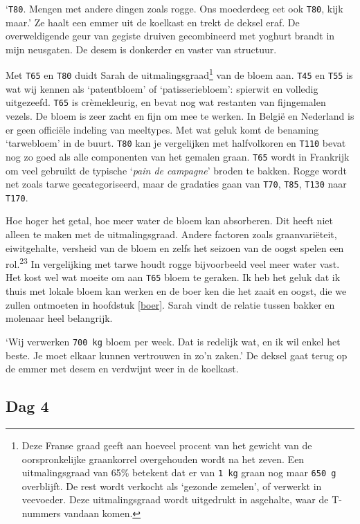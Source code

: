 \documentclass[
  11pt,
  dutch,
]{memoir}
\begin{document}
`\texttt{T80}. Mengen met andere dingen zoals rogge. Ons moederdeeg eet
ook \texttt{T80}, kijk maar.' Ze haalt een emmer uit de koelkast en
trekt de deksel eraf. De overweldigende geur van gegiste druiven
gecombineerd met yoghurt brandt in mijn neusgaten. De desem is donkerder
en vaster van structuur.

Met \texttt{T65} en \texttt{T80} duidt Sarah de
uitmalingsgraad\footnote{Deze Franse graad geeft aan hoeveel procent van
  het gewicht van de oorspronkelijke graankorrel overgehouden wordt na
  het zeven. Een uitmalingsgraad van 65\% betekent dat er van
  \texttt{1\ kg} graan nog maar \texttt{650\ g} overblijft. De rest
  wordt verkocht als `gezonde zemelen', of verwerkt in veevoeder. Deze
  uitmalingsgraad wordt uitgedrukt in asgehalte, waar de T-nummers
  vandaan komen.} van de bloem aan. \texttt{T45} en \texttt{T55} is wat
wij kennen als `patentbloem' of `patisseriebloem': spierwit en volledig
uitgezeefd. \texttt{T65} is crèmekleurig, en bevat nog wat restanten van
fijngemalen vezels. De bloem is zeer zacht en fijn om mee te werken. In
België en Nederland is er geen officiële indeling van meeltypes. Met wat
geluk komt de benaming `tarwebloem' in de buurt. \texttt{T80} kan je
vergelijken met halfvolkoren en \texttt{T110} bevat nog zo goed als alle
componenten van het gemalen graan. \texttt{T65} wordt in Frankrijk om
veel gebruikt de typische `\emph{pain de campagne}' broden te bakken.
Rogge wordt net zoals tarwe gecategoriseerd, maar de gradaties gaan van
\texttt{T70}, \texttt{T85}, \texttt{T130} naar \texttt{T170}.

Hoe hoger het getal, hoe meer water de bloem kan absorberen. Dit heeft
niet alleen te maken met de uitmalingsgraad. Andere factoren zoals
graanvariëteit, eiwitgehalte, versheid van de bloem en zelfs het seizoen
van de oogst spelen een rol.\textsuperscript{23} In vergelijking met
tarwe houdt rogge bijvoorbeeld veel meer water vast. Het kost wel wat
moeite om aan \texttt{T65} bloem te geraken. Ik heb het geluk dat ik
thuis met lokale bloem kan werken en de boer ken die het zaait en oogst,
die we zullen ontmoeten in hoofdstuk \ref{boer}. Sarah vindt de relatie
tussen bakker en molenaar heel belangrijk.

`Wij verwerken \texttt{700\ kg} bloem per week. Dat is redelijk wat, en
ik wil enkel het beste. Je moet elkaar kunnen vertrouwen in zo'n zaken.'
De deksel gaat terug op de emmer met desem en verdwijnt weer in de
koelkast.

\hypertarget{dag-4}{%
\subsection{Dag 4}\label{dag-4}}
\end{document}
